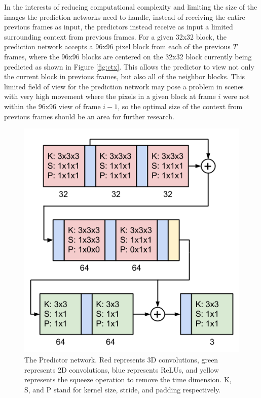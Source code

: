\documentclass[10pt,twocolumn,letterpaper]{article}
\begin{document}
In the interests of reducing computational complexity and limiting the size of the images the prediction networks need to handle, instead of receiving the entire previous frames as input, the predictors instead receive as input a limited surrounding context from previous frames. For a given 32x32 block, the prediction network accepts a 96x96 pixel block from each of the previous $T$ frames, where the 96x96 blocks are centered on the 32x32 block currently being predicted as shown in Figure \ref{fig:ctx}. This allows the predictor to view not only the current block in previous frames, but also all of the neighbor blocks. This limited field of view for the prediction network may pose a problem in scenes with very high movement where the pixels in a given block at frame $i$ were not within the 96x96 view of frame $i - 1$, so the optimal size of the context from previous frames should be an area for further research.

\begin{figure}[t]
\begin{center}
  \includegraphics[width=0.8\linewidth]{pred_net}
\end{center}
   \caption{The Predictor network. Red represents 3D convolutions, green represents 2D convolutions, blue represents ReLUs, and yellow represents the squeeze operation to remove the time dimension. K, S, and P stand for kernel size, stride, and padding respectively.}
   \label{fig:pred}
\end{figure}
\end{document}
